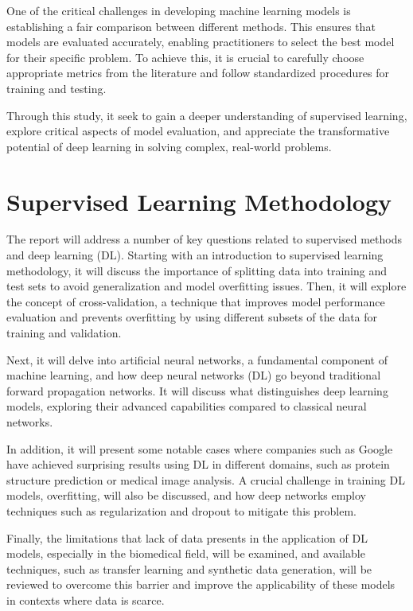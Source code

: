 \documentclass{llncs}
\begin{document}
One of the critical challenges in developing machine learning models is establishing a fair comparison between different methods. This ensures that models are evaluated accurately, enabling practitioners to select the best model for their specific problem. To achieve this, it is crucial to carefully choose appropriate metrics from the literature and follow standardized procedures for training and testing.\cite{LeCun2015}

Through this study, it seek to gain a deeper understanding of supervised learning, explore critical aspects of model evaluation, and appreciate the transformative potential of deep learning in solving complex, real-world problems.


\section{Supervised Learning Methodology}

The report will address a number of key questions related to supervised methods and deep learning (DL). Starting with an introduction to supervised learning methodology, it will discuss the importance of splitting data into training and test sets to avoid generalization and model overfitting issues. Then, it will explore the concept of cross-validation, a technique that improves model performance evaluation and prevents overfitting by using different subsets of the data for training and validation.

Next, it will delve into artificial neural networks, a fundamental component of machine learning, and how deep neural networks (DL) go beyond traditional forward propagation networks. It will discuss what distinguishes deep learning models, exploring their advanced capabilities compared to classical neural networks.

In addition, it will present some notable cases where companies such as Google have achieved surprising results using DL in different domains, such as protein structure prediction or medical image analysis. A crucial challenge in training DL models, overfitting, will also be discussed, and how deep networks employ techniques such as regularization and dropout to mitigate this problem.

Finally, the limitations that lack of data presents in the application of DL models, especially in the biomedical field, will be examined, and available techniques, such as transfer learning and synthetic data generation, will be reviewed to overcome this barrier and improve the applicability of these models in contexts where data is scarce.
\end{document}
